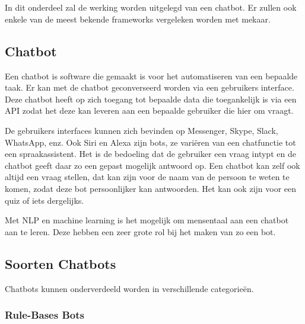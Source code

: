 \chapter{}
\label{ch:stand-van-zaken}



In dit onderdeel zal de werking worden uitgelegd van een chatbot. Er zullen ook enkele van de meest bekende frameworks vergeleken worden met mekaar.

\section{Chatbot}
\label{sec:Chatbot}

Een chatbot is software die gemaakt is voor het automatiseren van een bepaalde taak. Er kan met de chatbot geconverseerd worden via een gebruikers interface. Deze chatbot heeft op zich toegang tot bepaalde data die toegankelijk is via een API zodat het deze kan leveren aan een bepaalde gebruiker die hier om vraagt.

De gebruikers interfaces kunnen zich bevinden op Messenger, Skype, Slack, WhatsApp, enz. Ook Siri en Alexa zijn bots, ze variëren van een chatfunctie tot een spraakassistent. Het is de bedoeling dat de gebruiker een vraag intypt en de chatbot geeft daar zo een gepast mogelijk antwoord op. Een chatbot kan zelf ook altijd een vraag stellen, dat kan zijn voor de naam van de persoon te weten te komen, zodat deze bot persoonlijker kan antwoorden. Het kan ook zijn voor een quiz of iets dergelijks.

Met NLP en machine learning is het mogelijk om mensentaal aan een chatbot aan te leren. Deze hebben een zeer grote rol bij het maken van zo een bot. ~\autocite{Assaf2017}

\section{Soorten Chatbots}
\label{sec:Soorten Chatbots}

Chatbots kunnen onderverdeeld worden in verschillende categorieën.

\subsection{Rule-Bases Bots}
\label{Rule-Bases Bots}

